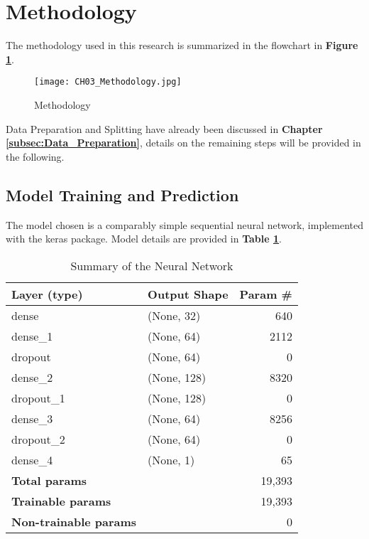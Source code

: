 \section{Methodology}\label{sec:Methodology}

The methodology used in this research is summarized in the flowchart in \textbf{Figure \ref{fig:CH03_Methodology}}. 

\begin{figure}[h]
    \centering
    \texttt{[image: CH03\_Methodology.jpg]}
    \caption{Methodology}
    \label{fig:CH03_Methodology}
\end{figure}

Data Preparation and Splitting have already been discussed in \textbf{Chapter \ref{subsec:Data_Preparation}}, details on the remaining steps will be provided in the following.

\subsection{Model Training and Prediction}\label{subsec:Model_Training_and_Prediction}

The model chosen is a comparably simple sequential neural network, implemented with the keras package. Model details are provided in \textbf{Table \ref{tab:CH03_Model_Details}}.

\begin{table}[h]
    \centering
    \begin{tabularx}{\textwidth}{lXr}
    \hline
    \textbf{Layer (type)} & \textbf{Output Shape} & \textbf{Param \#} \\
    \hline
    dense & (None, 32) & 640 \\
    dense\_1 & (None, 64) & 2112 \\
    dropout & (None, 64) & 0 \\
    dense\_2 & (None, 128) & 8320 \\
    dropout\_1 & (None, 128) & 0 \\
    dense\_3 & (None, 64) & 8256 \\
    dropout\_2 & (None, 64) & 0 \\
    dense\_4 & (None, 1) & 65 \\
    \hline
    \textbf{Total params} & & 19,393 \\
    \textbf{Trainable params} & & 19,393 \\
    \textbf{Non-trainable params} & & 0 \\
    \hline
    \end{tabularx}
    \caption{Summary of the Neural Network}
    \label{tab:CH03_Model_Details}
\end{table}



